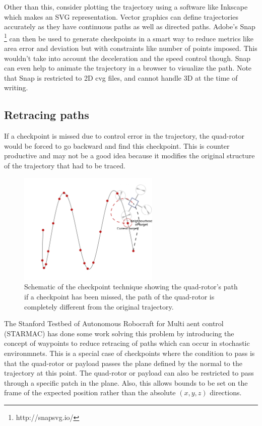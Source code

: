 \documentclass[hidelinks,BTech]{iitmdiss}
\begin{document}
Other than this, consider plotting the trajectory using a software like Inkscape which makes an SVG representation. Vector graphics can define trajectories accurately as they have continuous paths as well as directed paths. Adobe's Snap \footnote{http://snapsvg.io/} can then be used to generate checkpoints in a smart way to reduce metrics like area error and deviation but with constraints like number of points imposed. This wouldn't take into account the deceleration and the speed control though. Snap can even help to animate the trajectory in a browser to visualize the path. Note that Snap is restricted to 2D cvg files, and cannot handle 3D at the time of writing.

\subsection{Retracing paths}
If a checkpoint is missed due to control error in the trajectory, the quad-rotor would be forced to go backward and find this checkpoint. This is counter productive and may not be a good idea because it modifies the original structure of the trajectory that had to be traced.


\begin{figure}[H]
  \centering
    \includegraphics[width=0.6\textwidth]{checkpoint_con.png}
    \caption{Schematic of the checkpoint technique showing the quad-rotor's path if a checkpoint has been missed, the path of the quad-rotor is completely different from the original trajectory.}
\end{figure}

The Stanford Testbed of Autonomous Robocraft for Multi aent control (STARMAC) \cite{STARMAC} has done some work solving this problem by introducing the concept of waypoints to reduce retracing of paths which can occur in stochastic environmnets. This is a special case of checkpoints where the condition to pass is that the quad-rotor or payload passes the plane defined by the normal to the trajectory at this point. The quad-rotor or payload can also be restricted to pass through a specific patch in the plane. Also, this allows bounds to be set on the frame of the expected position rather than the absolute $(x, y, z)$ directions.
\end{document}

